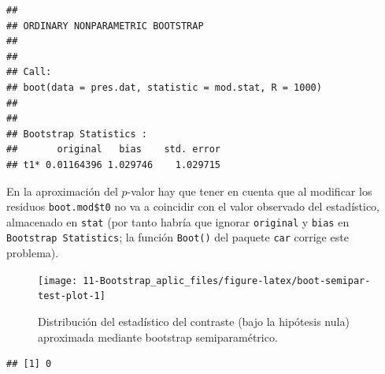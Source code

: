 \documentclass[
]{book}
\newenvironment{Shaded}{\begin{snugshade}}{\end{snugshade}}
\newcommand{\AttributeTok}[1]{\textcolor[rgb]{0.77,0.63,0.00}{#1}}
\newcommand{\ConstantTok}[1]{\textcolor[rgb]{0.00,0.00,0.00}{#1}}
\newcommand{\DecValTok}[1]{\textcolor[rgb]{0.00,0.00,0.81}{#1}}
\newcommand{\FunctionTok}[1]{\textcolor[rgb]{0.00,0.00,0.00}{#1}}
\newcommand{\NormalTok}[1]{#1}
\newcommand{\OtherTok}[1]{\textcolor[rgb]{0.56,0.35,0.01}{#1}}
\newcommand{\SpecialCharTok}[1]{\textcolor[rgb]{0.00,0.00,0.00}{#1}}
\newcommand{\StringTok}[1]{\textcolor[rgb]{0.31,0.60,0.02}{#1}}
\theoremstyle{break}
\theoremstyle{nonumberplain}
\begin{document}
\begin{verbatim}
## 
## ORDINARY NONPARAMETRIC BOOTSTRAP
## 
## 
## Call:
## boot(data = pres.dat, statistic = mod.stat, R = 1000)
## 
## 
## Bootstrap Statistics :
##       original   bias    std. error
## t1* 0.01164396 1.029746    1.029715
\end{verbatim}

En la aproximación del \(p\)-valor hay que tener en cuenta que al modificar los residuos
\texttt{boot.mod\$t0} no va a coincidir con el valor observado del estadístico,
almacenado en \texttt{stat} (por tanto habría que ignorar \texttt{original} y \texttt{bias}
en \texttt{Bootstrap\ Statistics};
la función \texttt{Boot()} del paquete \texttt{car} corrige este problema).

\begin{Shaded}
\end{Shaded}

\begin{figure}[!htb]

{\centering \texttt{[image: 11-Bootstrap\_aplic\_files/figure-latex/boot-semipar-test-plot-1]} 

}

\caption{Distribución del estadístico del contraste (bajo la hipótesis nula) aproximada mediante bootstrap semiparamétrico.}\label{fig:boot-semipar-test-plot}
\end{figure}

\begin{Shaded}
\end{Shaded}

\begin{verbatim}
## [1] 0
\end{verbatim}
\end{document}
